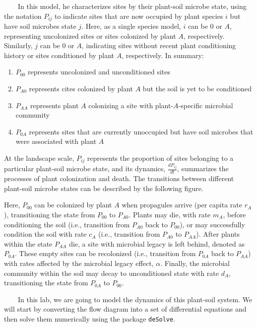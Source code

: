 \documentclass[
]{book}
\providecommand{\tightlist}{%
  \setlength{\itemsep}{0pt}\setlength{\parskip}{0pt}}
\begin{document}
~~~~In this model, he characterizes sites by their plant-soil microbe state, using the notation \(P_{ij}\) to indicate sites that are now occupied by plant species \(i\) but have soil microbes state \(j\). Here, as a single species model, \(i\) can be 0 or \(A\), representing uncolonized sites or sites colonized by plant \(A\), respectively. Similarly, \(j\) can be 0 or \(A\), indicating sites without recent plant conditioning history or sites conditioned by plant \(A\), respectively. In summary:

\begin{enumerate}
\def\labelenumi{\arabic{enumi}.}
\tightlist
\item
  \(P_{00}\) represents uncolonized and unconditioned sites
\item
  \(P_{A0}\) represents cites colonized by plant \(A\) but the soil is yet to be conditioned
\item
  \(P_{AA}\) represents plant \(A\) colonizing a site with plant-\(A\)-specific microbial community
\item
  \(P_{0A}\) represents sites that are currently unoccupied but have soil microbes that were associated with plant \(A\)
\end{enumerate}

At the landscape scale, \(P_{ij}\) represents the proportion of sites belonging to a particular plant-soil microbe state, and its dynamics, \(\frac {dP_{ij}}{dt}\), summarizes the processes of plant colonization and death. The transitions between different plant-soil microbe states can be described by the following figure.

Here, \(P_{00}\) can be colonized by plant \(A\) when propagules arrive (per capita rate \(r_{A}\)), transitioning the state from \(P_{00}\) to \(P_{A0}\). Plants may die, with rate \(m_{A}\), before conditioning the soil (i.e., transition from \(P_{A0}\) back to \(P_{00}\)), or may successfully condition the soil with rate \(c_{A}\) (i.e., transition from \(P_{A0}\) to \(P_{AA}\)). After plants within the state \(P_{AA}\) die, a site with microbial legacy is left behind, denoted as \(P_{0A}\). These empty sites can be recolonized (i.e., transition from \(P_{0A}\) back to \(P_{AA}\)) with rates affected by the microbial legacy effect, \(\alpha\). Finally, the microbial community within the soil may decay to unconditioned state with rate \(d_{A}\), transitioning the state from \(P_{0A}\) to \(P_{00}\).

~~~~In this lab, we are going to model the dynamics of this plant-soil system. We will start by converting the flow diagram into a set of differential equations and then solve them numerically using the package \texttt{deSolve}.

  
\end{document}
